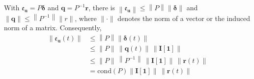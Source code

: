 \documentclass[accepted]{uai2023}
\newcommand{\vect}[1]{\mathbf{#1}}
\newcommand{\Err}{\mathfrak{e}}
\begin{document}
    With $\Err_{\vect{u}} = P \pmb{\delta}$ and $\vect{q} = P^{-1}\vect{r}$, there is $\left\|\Err_{\vect{u}}\right\| \leq \left\|P\right\| \|\pmb{\delta}\|$ and $\|\vect{q}\| \leq \left\|P^{-1}\right\| \|r\|$, where $\|\cdot\|$ denotes the norm of a vector or the induced norm of a matrix. Consequently,
    \begin{align}
        \left\|\Err_{\vect{u}}(t)\right\| &\leq \left\|P\right\| \|\pmb{\delta}(t)\| \\
        &\leq \|P\|\, \|\vect{q}(t)\|\, \left\|\vect{I}[\vect{1}]\right\|\\
        &\leq \|P\|\,\left\|P^{-1}\right\|\, \left\|\vect{I}[\vect{1}]\right\| \, \|\vect{r}(t)\| \\
        &=\mathrm{cond}(P)\left\|\vect{I}[\vect{1}]\right\| \, \|\vect{r}(t)\|
    \end{align}

    
\end{document}
